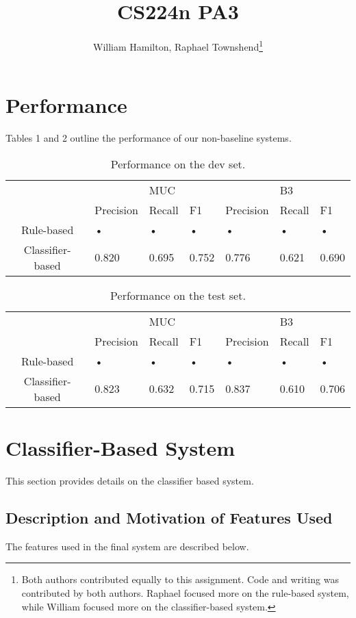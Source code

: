 \documentclass[12pt,a4paper]{article}
\author{William Hamilton, Raphael Townshend\footnote{Both authors contributed equally to this assignment. Code and writing was contributed by both authors. Raphael focused more on the rule-based system, while William focused more on the classifier-based system.}}
\title{CS224n PA3}
\begin{document}
\maketitle
\section{Performance}
Tables 1 and 2 outline the performance of our non-baseline systems. 
\begin{table}[h!]
\centering
\begin{tabular}{c|m{40pt} m{40pt} m{40pt}| m{40pt} m{40pt} m{40pt}}
 &  & MUC &  &  & B3 &  \\ 
& Precision & Recall & F1 & Precision & Recall & F1 \\ 
\hline 
Rule-based  & • & • & • & • & • & • \\ 
Classifier-based & 0.820 & 0.695 & 0.752 & 0.776 & 0.621 & 0.690 \\ 
\hline 
\end{tabular}
\caption{Performance on the dev set.}
\end{table} 
\begin{table}[h!]
\centering
\begin{tabular}{c|m{40pt} m{40pt} m{40pt}| m{40pt} m{40pt} m{40pt}}
 &  & MUC &  &  & B3 &  \\ 
& Precision & Recall & F1 & Precision & Recall & F1 \\ 
\hline 
Rule-based  & • & • & • & • & • & • \\ 
Classifier-based & 0.823 & 0.632 & 0.715 & 0.837 & 0.610 & 0.706 \\ 
\hline 
\end{tabular}
\caption{Performance on the test set.}
\end{table} 

\section{Classifier-Based System}

This section provides details on the classifier based system.

\subsection{Description and Motivation of Features Used}

The features used in the final system are described below. 
\end{document}
